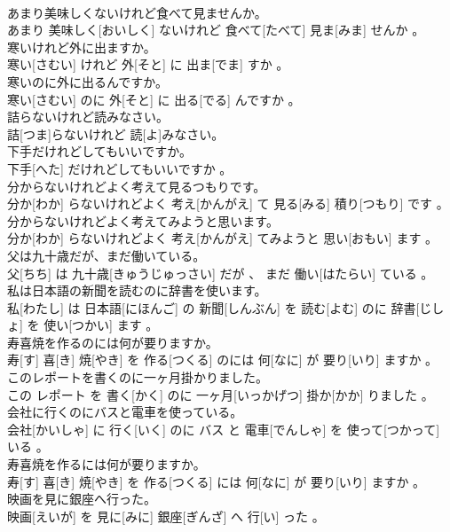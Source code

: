 \documentclass[8pt]{extreport}
\begin{document}
\begin{CJK}{UTF8}{min}
\\	あまり美味しくないけれど食べて見ませんか。	
\\	あまり 美味しく[おいしく] ないけれど 食べて[たべて] 見ま[みま] せんか 。
\\	寒いけれど外に出ますか。	
\\	寒い[さむい] けれど 外[そと] に 出ま[でま] すか 。
\\	寒いのに外に出るんですか。	
\\	寒い[さむい] のに 外[そと] に 出る[でる] んですか 。
\\	詰らないけれど読みなさい。	
\\	詰[つま]らないけれど 読[よ]みなさい。
\\	下手だけれどしてもいいですか。	
\\	下手[へた] だけれどしてもいいですか 。
\\	分からないけれどよく考えて見るつもりです。	
\\	分か[わか] らないけれどよく 考え[かんがえ] て 見る[みる] 積り[つもり] です 。
\\	分からないけれどよく考えてみようと思います。	
\\	分か[わか] らないけれどよく 考え[かんがえ] てみようと 思い[おもい] ます 。
\\	父は九十歳だが、まだ働いている。	
\\	父[ちち] は 九十歳[きゅうじゅっさい] だが 、 まだ 働い[はたらい] ている 。
\\	私は日本語の新聞を読むのに辞書を使います。	
\\	私[わたし] は 日本語[にほんご] の 新聞[しんぶん] を 読む[よむ] のに 辞書[じしょ] を 使い[つかい] ます 。
\\	寿喜焼を作るのには何が要りますか。	
\\	寿[す] 喜[き] 焼[やき] を 作る[つくる] のには 何[なに] が 要り[いり] ますか 。
\\	このレポートを書くのに一ヶ月掛かりました。	
\\	この レポート を 書く[かく] のに 一ヶ月[いっかげつ] 掛か[かか] りました 。
\\	会社に行くのにバスと電車を使っている。	
\\	会社[かいしゃ] に 行く[いく] のに バス と 電車[でんしゃ] を 使って[つかって] いる 。
\\	寿喜焼を作るには何が要りますか。	
\\	寿[す] 喜[き] 焼[やき] を 作る[つくる] には 何[なに] が 要り[いり] ますか 。
\\	映画を見に銀座へ行った。	
\\	映画[えいが] を 見に[みに] 銀座[ぎんざ] へ 行[い] った 。

\end{CJK}
\end{document}

